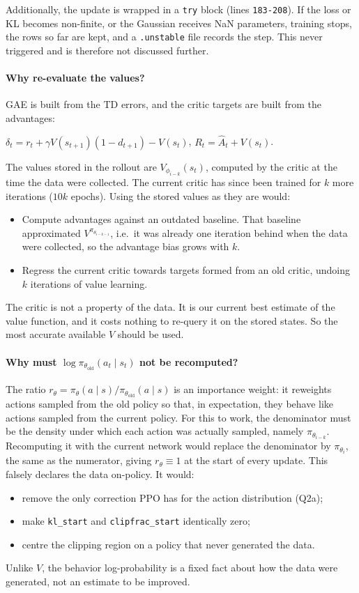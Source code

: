\documentclass[11pt]{article}
\newcommand{\piold}{\pi_{\theta_{\mathrm{old}}}}
\newcommand{\Ahat}{\hat{A}}
\newcommand{\code}[1]{\texttt{#1}}
\begin{document}
Additionally, the update is wrapped in a \code{try} block (lines \texttt{183-208}). If the
loss or KL becomes non-finite, or the Gaussian receives NaN parameters, training stops,
the rows so far are kept, and a \code{.unstable} file records the step. This never triggered
and is therefore not discussed further.

\paragraph{Why re-evaluate the values?}
GAE is built from the TD errors, and the critic targets are built from the advantages:
\begin{center}
  $\delta_t = r_t + \gamma V(s_{t+1})(1-d_{t+1}) - V(s_t)$, \qquad $R_t=\Ahat_t + V(s_t)$.
\end{center}
The values stored in the rollout are $V_{\phi_{i-k}}(s_t)$, computed by the critic at the time
the data were collected. The current critic has since been trained for $k$ more iterations
($10k$ epochs). Using the stored values as they are would:
\begin{itemize}
  \item Compute advantages against an outdated baseline. That baseline approximated
        $V^{\pi_{\theta_{i-k-1}}}$, i.e.\ it was already one iteration behind when the data were
        collected, so the advantage bias grows with $k$.
  \item Regress the current critic towards targets formed from an old critic, undoing $k$
        iterations of value learning.
\end{itemize}
The critic is not a property of the data. It is our current best estimate of the value
function, and it costs nothing to re-query it on the stored states. So the most accurate
available $V$ should be used.

\paragraph{Why must $\log\piold(a_t\mid s_t)$ not be recomputed?}
The ratio $r_\theta = \pi_\theta(a\mid s)/\piold(a\mid s)$ is an importance weight: it
reweights actions sampled from the old policy so that, in expectation, they behave like
actions sampled from the current policy. For this to work, the denominator must be the
density under which each action was actually sampled, namely $\pi_{\theta_{i-k}}$.
Recomputing it with the current network would replace the denominator by $\pi_{\theta_i}$,
the same as the numerator, giving $r_\theta\equiv1$ at the start of every update. This
falsely declares the data on-policy. It would:
\begin{itemize}[nosep]
  \item remove the only correction PPO has for the action distribution (Q2a);
  \item make \code{kl\_start} and \code{clipfrac\_start} identically zero;
  \item centre the clipping region on a policy that never generated the data.
\end{itemize}
Unlike $V$, the behavior log-probability is a fixed fact about how the data were generated,
not an estimate to be improved.
\end{document}
